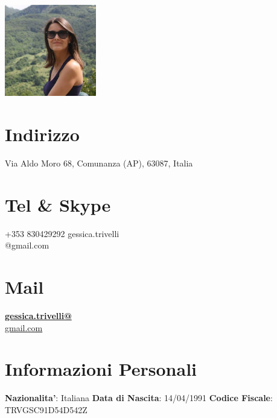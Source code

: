 \documentclass[11pt]{friggeri-cv}
\begin{document}

\begin{aside}
  \includegraphics[width=4cm, keepaspectratio]{img/gessica_crop.jpg}
  \section{Indirizzo}
    Via Aldo Moro 68,
    Comunanza (AP), 63087, Italia
  \section{Tel \& Skype}
    +353 830429292\vspace{3pt}
    gessica.trivelli\\@gmail.com
  \section{Mail}
    \href{mailto:gessica.trivelli@gmail.com}{\textbf{gessica.trivelli@}\\gmail.com}
  \section{Informazioni Personali}
    \textbf{Nazionalita'}: 
    Italiana
    \textbf{Data di Nascita}: 14/04/1991
    \textbf{Codice Fiscale}: TRVGSC91D54D542Z
\end{aside}

\vspace{-15pt}
\end{document}
